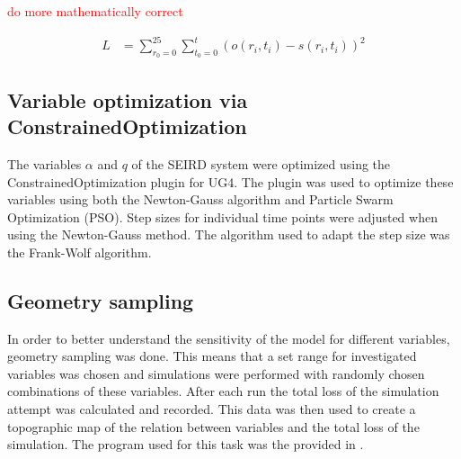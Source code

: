 \textcolor{red}{do more mathematically correct}

\begin{align}
	L &= \sum_{r_0=0}^{25} \sum_{t_{0}=0}^{t} (o(r_i,t_i) - s(r_i,t_i))^{2}
	\label{eq:loss_newton}
\end{align}


\subsection{Variable optimization via ConstrainedOptimization}
The variables $\alpha$ and $q$ of the SEIRD system were optimized using the ConstrainedOptimization plugin for UG4\cite{???}. %
The plugin was used to optimize these variables using both the Newton-Gauss algorithm and Particle Swarm Optimization (PSO). Step sizes for
individual time points were adjusted when using the Newton-Gauss method. The algorithm used to adapt the step size was the Frank-Wolf
algorithm\cite{devansh}\cite{frank-wolf}. %


\subsection{Geometry sampling}
In order to better understand the sensitivity of the model for different variables, geometry sampling was done. This means that a set range for
investigated variables was chosen and simulations were performed with randomly chosen combinations of these variables. After each run the total
loss of the simulation attempt was calculated and recorded. This data was then used to create a topographic map of the relation between variables
and the total loss of the simulation. The program used for this task was the  provided in .

